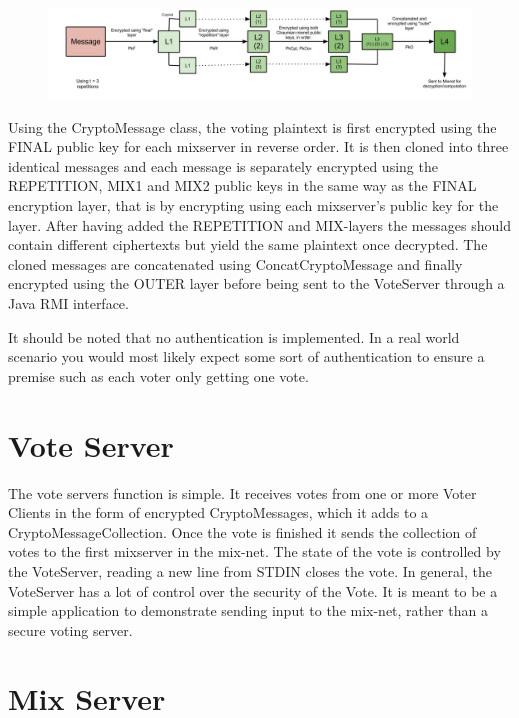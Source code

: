 \documentclass[a4paper,11pt]{kth-mag}
\begin{document}
\newpage
\begin{figure}
\centering
\includegraphics[width=1.0\textwidth]{Sender_Encryption.png}
\end{figure}


Using the CryptoMessage class, the voting plaintext is first encrypted using the FINAL public key for each mixserver in reverse order. It is then cloned into three identical messages and each message is separately encrypted using the REPETITION, MIX1 and MIX2 public keys in the same way as the FINAL encryption layer, that is by encrypting using each mixserver’s public key for the layer. After having added the REPETITION and MIX-layers the messages should contain different ciphertexts but yield the same plaintext once decrypted. The cloned messages are concatenated using ConcatCryptoMessage and finally encrypted using the OUTER layer before being sent to the VoteServer through a Java RMI interface.

It should be noted that no authentication is implemented. In a real world scenario you would most likely expect some sort of authentication to ensure a premise such as each voter only getting one vote.

\section{Vote Server}

The vote servers function is simple. It receives votes from one or more Voter Clients in the form of encrypted CryptoMessages, which it adds to a CryptoMessageCollection. Once the vote is finished it sends the collection of votes to the first mixserver in the mix-net. The state of the vote is controlled by the VoteServer, reading a new line from STDIN closes the vote. In general, the VoteServer has a lot of control over the security of the Vote. It is meant to be a simple application to demonstrate sending input to the mix-net, rather than a secure voting server.

\section{Mix Server}
\end{document}

